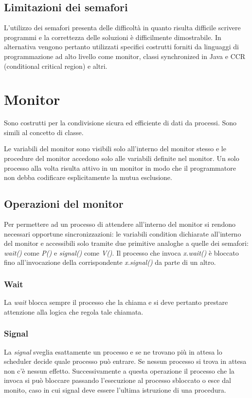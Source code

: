 \subsection{Limitazioni dei semafori}
L'utilizzo dei semafori presenta delle difficolt\`a in quanto risulta difficile scrivere programmi e la correttezza delle soluzioni \`e difficilmente dimostrabile. In alternativa 
vengono pertanto utilizzati specifici costrutti forniti da linguaggi di programmazione ad alto livello come monitor, classi synchronized in Java e CCR (conditional critical region) e 
altri. 
\section{Monitor}
Sono costrutti per la condivisione sicura ed efficiente di dati da processi. Sono simili al concetto di classe.

Le variabili del monitor sono visibili solo all'interno del monitor stesso e le procedure del monitor accedono solo alle variabili definite nel monitor. Un solo processo alla volta 
risulta attivo in un monitor in modo che il programmatore non debba codificare esplicitamente la mutua esclusione. 
\subsection{Operazioni del monitor}
Per permettere ad un processo di attendere all'interno del monitor si rendono necessari opportune sincronizzazioni: le variabili condition dichiarate all'interno del monitor e 
accessibili solo tramite due primitive analoghe a quelle dei semafori: \emph{wait()} come \emph{P()} e \emph{signal()} come \emph{V()}. Il processo che invoca \emph{x.wait()} \`e 
bloccato fino all'invocazione della corrispondente \emph{x.signal()} da parte di un altro. 
\subsubsection{Wait}
La \emph{wait} blocca sempre il processo che la chiama e si deve pertanto prestare attenzione alla logica che regola tale chiamata. 
\subsubsection{Signal}
La \emph{signal} sveglia esattamente un processo e se ne trovano pi\`u in attesa lo scheduler decide quale processo pu\`o entrare. Se nessun processo si trova in attesa non c'\`e nessun
effetto. Successivamente a questa operazione il processo che la invoca si pu\`o bloccare passando l'esecuzione al processo sbloccato o esce dal monito, caso in cui signal deve essere
l'ultima istruzione di una procedura. 
